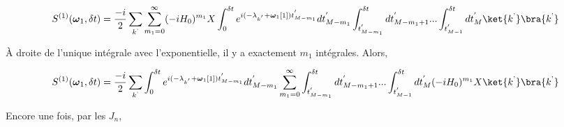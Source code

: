 \begin{equation*}
    S^{(1)}(\boldsymbol{\omega}_1, \delta t) = \frac{-i}{2}\sum_{k^\text{'}}\sum_{m_1 = 0}^{\infty}(-iH_0)^{m_1}X \int_{0}^{\delta t}e^{i(-\lambda_{k^{'}}+\boldsymbol{\omega}_1[1])t^{'}_{M-m_1}} dt_{M-m_1}^{'} \int_{t^{'}_{M-m_1}}^{\delta t} dt^{'}_{M-m_1+1} ... \int_{t^{'}_{M-1}}^{\delta t} dt^{'}_{M}  \ket{k^\text{'}}\bra{k^\text{'}}
\end{equation*}

À droite de l'unique intégrale avec l'exponentielle, il y a exactement $m_1$ intégrales. Alors, 

\begin{equation*}
    S^{(1)}(\boldsymbol{\omega}_1, \delta t) = \frac{-i}{2}\sum_{k^\text{'}} \int_{0}^{\delta t}e^{i(-\lambda_{k^{'}}+\boldsymbol{\omega}_1[1])t^{'}_{M-m_1}} dt_{M-m_1}^{'} \sum_{m_1 = 0}^{\infty}\int_{t^{'}_{M-m_1}}^{\delta t} dt^{'}_{M-m_1+1} ... \int_{t^{'}_{M-1}}^{\delta t} dt^{'}_{M}  (-iH_0)^{m_1}X\ket{k^\text{'}}\bra{k^\text{'}}
\end{equation*}

Encore une fois, par les $J_n$,

